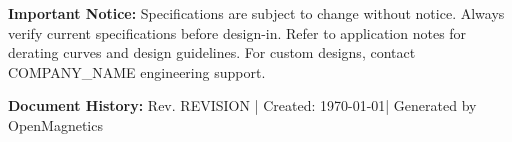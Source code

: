 \documentclass[10pt,a4paper]{article}
\begin{document}
\vspace{3mm}

\begin{tcolorbox}[
    colback=warning!10,
    colframe=warning!50,
    boxrule=0.3pt,
    arc=1mm,
    left=3mm,
    right=3mm,
    top=2mm,
    bottom=2mm
]
{\footnotesize\color{textdark}
\textbf{Important Notice:} Specifications are subject to change without notice. Always verify current specifications before design-in. Refer to application notes for derating curves and design guidelines. For custom designs, contact {{COMPANY_NAME}} engineering support.
}
\end{tcolorbox}

\vspace{2mm}
{\footnotesize\color{textmuted}
\textbf{Document History:} Rev. {{REVISION}} | Created: \today | Generated by OpenMagnetics
}

\label{LastPage}
\end{document}
